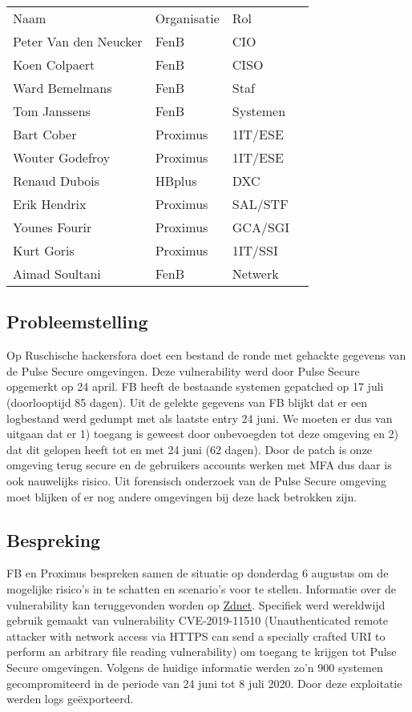 \documentclass[11pt]{article}
\begin{document}
\begin{center}
\begin{tabular}{llll}
Naam & Organisatie & Rol & \\
Peter Van den Neucker & FenB & CIO & \\
Koen Colpaert & FenB & CISO & \\
Ward Bemelmans & FenB & Staf & \\
Tom Janssens & FenB & Systemen & \\
Bart Cober & Proximus & 1IT/ESE & \\
Wouter Godefroy & Proximus & 1IT/ESE & \\
Renaud Dubois & HBplus & DXC & \\
Erik Hendrix & Proximus & SAL/STF & \\
Younes Fourir & Proximus & GCA/SGI & \\
Kurt Goris & Proximus & 1IT/SSI & \\
Aimad Soultani & FenB & Netwerk & \\
\end{tabular}
\end{center}

\subsection{Probleemstelling}
\label{sec:org7c0f18a}

Op Ruschische hackersfora doet een bestand de ronde met gehackte gegevens van de Pulse Secure omgevingen. Deze vulnerability werd door Pulse Secure opgemerkt op 24 april. FB heeft de bestaande systemen gepatched op 17 juli (doorlooptijd 85 dagen). Uit de gelekte gegevens van FB blijkt dat er een logbestand werd gedumpt met als laatste entry 24 juni. We moeten er dus van uitgaan dat er 1) toegang is geweest door onbevoegden tot deze omgeving en 2) dat dit gelopen heeft tot en met 24 juni (62 dagen). Door de patch is onze omgeving terug secure en de gebruikers accounts werken met MFA dus daar is ook nauwelijks risico. Uit forensisch onderzoek van de Pulse Secure omgeving moet blijken of er nog andere omgevingen bij deze hack betrokken zijn.

\subsection{Bespreking}
\label{sec:org65eb989}

FB en Proximus bespreken samen de situatie op donderdag 6 augustus om de mogelijke risico's in te schatten en scenario's voor te stellen. Informatie over de vulnerability kan teruggevonden worden op \href{https://www.zdnet.com/article/hacker-leaks-passwords-for-900-enterprise-vpn-servers/}{Zdnet}. Specifiek werd wereldwijd gebruik gemaakt van vulnerability CVE-2019-11510 (Unauthenticated remote attacker with network access via HTTPS can send a specially crafted URI to perform an arbitrary file reading vulnerability) om toegang te krijgen tot Pulse Secure omgevingen. Volgens de huidige informatie werden zo'n 900 systemen gecompromiteerd in de periode van 24 juni tot 8 juli 2020. Door deze exploitatie werden logs geëxporteerd.
\end{document}
